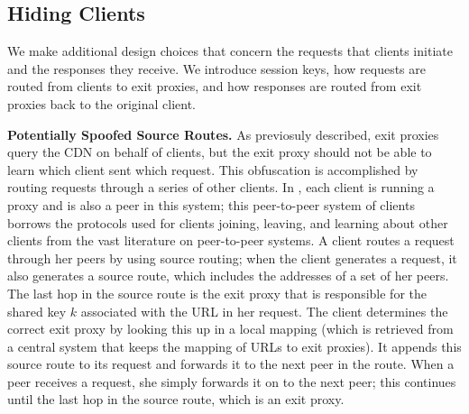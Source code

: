 
\subsection{Hiding Clients}
\label{sec:hiding_clients}
We make additional design choices that concern the requests that clients initiate
and the responses they receive. We 
introduce session keys, how requests are routed from clients to exit proxies, and how responses 
are routed from exit proxies back to the original client.

\textbf{Potentially Spoofed Source Routes.}
As previosuly described, exit proxies query the CDN on behalf of clients, but the
exit proxy
should not be able to learn which client sent which request.  This obfuscation is
accomplished by routing requests through
a series of other clients.  In \system{}, each client is running a proxy and is
also a peer in this system; this 
peer-to-peer system of clients borrows the 
protocols used for clients joining, leaving, and learning about other clients from
the vast literature on peer-to-peer systems. A client routes a request through
her peers by using source routing; when the client generates a request, it also
generates a source route, which includes
the addresses of a set of her peers.  The last hop in the source route is the exit proxy that is responsible for the 
shared key $k$ associated with the URL in her request.  The client determines the correct exit proxy by looking this 
up in a local mapping (which is retrieved from a central system that keeps the mapping of URLs to exit proxies).  
It appends this source route to its request and forwards it to the next peer
in the route.  When a peer receives
a request, she simply forwards it on to the next peer; this continues until the last hop in the source route, which 
is an exit proxy. 

